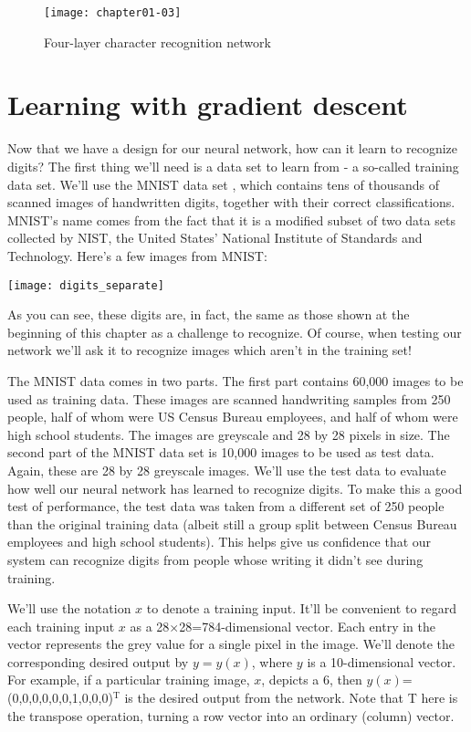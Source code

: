 \begin{figure}[tbhp]
\centering
\texttt{[image: chapter01-03]}
\caption{Four-layer character recognition network}
\label{fig:chapter01-03}
\end{figure}


\section{Learning with gradient descent}
\label{sec:Learningwithgradientdescent}
Now that we have a design for our neural network, how can it learn to recognize digits? The first thing we'll need is a data set to learn from - a so-called training data set. We'll use the MNIST data set \cite{LeCun2019}, which contains tens of thousands of scanned images of handwritten digits, together with their correct classifications. MNIST's name comes from the fact that it is a modified subset of two data sets collected by NIST, the United States' National Institute of Standards and Technology. Here's a few images from MNIST:

\begin{marginfigure}
\texttt{[image: digits\_separate]}
\end{marginfigure}

As you can see, these digits are, in fact, the same as those shown at the beginning of this chapter as a challenge to recognize. Of course, when testing our network we'll ask it to recognize images which aren't in the training set!

The MNIST data comes in two parts. The first part contains 60,000 images to be used as training data. These images are scanned handwriting samples from 250 people, half of whom were US Census Bureau employees, and half of whom were high school students. The images are greyscale and 28 by 28 pixels in size. The second part of the MNIST data set is 10,000 images to be used as test data. Again, these are 28 by 28 greyscale images. We'll use the test data to evaluate how well our neural network has learned to recognize digits. To make this a good test of performance, the test data was taken from a different set of 250 people than the original training data (albeit still a group split between Census Bureau employees and high school students). This helps give us confidence that our system can recognize digits from people whose writing it didn't see during training.

We'll use the notation $x$ to denote a training input. It'll be convenient to regard each training input $x$ as a 28$\times$28=784-dimensional vector. Each entry in the vector represents the grey value for a single pixel in the image. We'll denote the corresponding desired output by $y=y(x)$, where $y$ is a 10-dimensional vector. For example, if a particular training image, $x$, depicts a 6, then $y(x)$=(0,0,0,0,0,0,1,0,0,0)$^\textrm{T}$ is the desired output from the network. Note that T here is the transpose operation, turning a row vector into an ordinary (column) vector.

